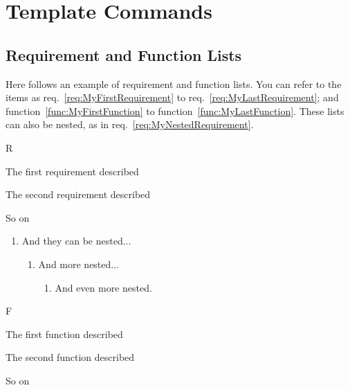 \section{Template Commands}

\subsection{Requirement and Function Lists}

Here follows an example of requirement and function lists.  You can refer to the items as req.~\ref{req:MyFirstRequirement} to req.~\ref{req:MyLastRequirement}; and function~\ref{func:MyFirstFunction} to function~\ref{func:MyLastFunction}.  These lists can also be nested, as in req.~\ref{req:MyNestedRequirement}.

\begin{SpecList}{R}
  \item The first requirement described\label{req:MyFirstRequirement}
  \item The second requirement described
  \item So on\label{req:MyLastRequirement}
  \begin{enumerate}
    \item And they can be nested...
    \begin{enumerate}
      \item And more nested...
      \begin{enumerate}
        \item And even more nested.
      \end{enumerate}
    \end{enumerate}
  \end{enumerate}
\end{SpecList}

\begin{SpecList}{F}
  \item The first function described\label{func:MyFirstFunction}
  \item The second function described
  \item So on\label{func:MyLastFunction}
\end{SpecList}
